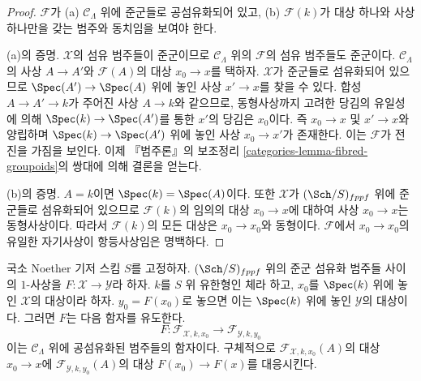\begin{proof}
$\mathcal{F}$가 (a) $\mathcal{C}_\Lambda$ 위에 준군들로 공섬유화되어 있고,
(b) $\mathcal{F}(k)$가 대상 하나와 사상 하나만을 갖는 범주와 동치임을
보여야 한다.

\medskip\noindent
(a)의 증명. $\mathcal{X}$의 섬유 범주들이 준군이므로
$\mathcal{C}_\Lambda$ 위의 $\mathcal{F}$의 섬유 범주들도 준군이다.
$\mathcal{C}_\Lambda$의 사상 $A \to A'$와 $\mathcal{F}(A)$의 대상
$x_0 \to x$를 택하자. $\mathcal{X}$가 준군들로 섬유화되어 있으므로
$\Spec(A') \to \Spec(A)$ 위에 놓인 사상 $x' \to x$를 찾을 수 있다.
합성 $A \to A' \to k$가 주어진 사상 $A \to k$와 같으므로, 동형사상까지
고려한 당김의 유일성에 의해 $\Spec(k) \to \Spec(A')$를 통한 $x'$의
당김은 $x_0$이다. 즉 $x_0 \to x$ 및 $x' \to x$와 양립하며
$\Spec(k) \to \Spec(A')$ 위에 놓인 사상 $x_0 \to x'$가 존재한다.
이는 $\mathcal{F}$가 전진을 가짐을 보인다. 이제 『범주론』의 보조정리
\ref{categories-lemma-fibred-groupoids}의 쌍대에 의해 결론을 얻는다.

\medskip\noindent
(b)의 증명. $A = k$이면 $\Spec(k) = \Spec(A)$이다. 또한
$\mathcal{X}$가 $(\Sch/S)_{fppf}$ 위에 준군들로 섬유화되어 있으므로
$\mathcal{F}(k)$의 임의의 대상 $x_0 \to x$에 대하여 사상
$x_0 \to x$는 동형사상이다. 따라서 $\mathcal{F}(k)$의 모든 대상은
$x_0 \to x_0$와 동형이다. $\mathcal{F}$에서 $x_0 \to x_0$의 유일한
자기사상이 항등사상임은 명백하다.
\end{proof}

\noindent
국소 Noether 기저 스킴 $S$를 고정하자. $(\Sch/S)_{fppf}$ 위의
준군 섬유화 범주들 사이의 $1$-사상을
$F : \mathcal{X} \to \mathcal{Y}$라 하자.
$k$를 $S$ 위 유한형인 체라 하고, $x_0$를 $\Spec(k)$ 위에 놓인
$\mathcal{X}$의 대상이라 하자. $y_0 = F(x_0)$로 놓으면 이는
$\Spec(k)$ 위에 놓인 $\mathcal{Y}$의 대상이다. 그러면 $F$는
다음 함자를 유도한다.
\begin{equation}
\label{equation-functoriality}
F :
\mathcal{F}_{\mathcal{X}, k, x_0}
\longrightarrow
\mathcal{F}_{\mathcal{Y}, k, y_0}
\end{equation}
이는 $\mathcal{C}_\Lambda$ 위에 공섬유화된 범주들의 함자이다. 구체적으로
$\mathcal{F}_{\mathcal{X}, k, x_0}(A)$의 대상 $x_0 \to x$에
$\mathcal{F}_{\mathcal{Y}, k, y_0}(A)$의 대상
$F(x_0) \to F(x)$를 대응시킨다.

